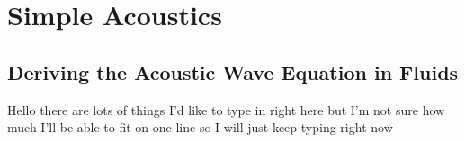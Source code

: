 \documentclass{book}
\begin{document}
\chapter{Simple Acoustics}

\section{Deriving the Acoustic Wave Equation in Fluids}

Hello there are lots of things I'd like to type in right here but I'm not sure how much I'll be able to fit on one line so I will just keep typing right now
\end{document}
